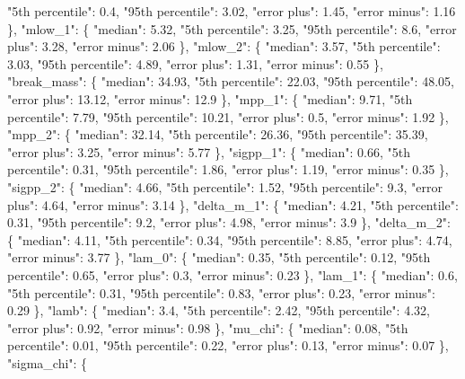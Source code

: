 {{        "5th percentile": 0.4, %
        "95th percentile": 3.02, %
        "error plus": 1.45, %
        "error minus": 1.16%
      \}, %
      "mlow\_1": \{%
        "median": 5.32, %
        "5th percentile": 3.25, %
        "95th percentile": 8.6, %
        "error plus": 3.28, %
        "error minus": 2.06%
      \}, %
      "mlow\_2": \{%
        "median": 3.57, %
        "5th percentile": 3.03, %
        "95th percentile": 4.89, %
        "error plus": 1.31, %
        "error minus": 0.55%
      \}, %
      "break\_mass": \{%
        "median": 34.93, %
        "5th percentile": 22.03, %
        "95th percentile": 48.05, %
        "error plus": 13.12, %
        "error minus": 12.9%
      \}, %
      "mpp\_1": \{%
        "median": 9.71, %
        "5th percentile": 7.79, %
        "95th percentile": 10.21, %
        "error plus": 0.5, %
        "error minus": 1.92%
      \}, %
      "mpp\_2": \{%
        "median": 32.14, %
        "5th percentile": 26.36, %
        "95th percentile": 35.39, %
        "error plus": 3.25, %
        "error minus": 5.77%
      \}, %
      "sigpp\_1": \{%
        "median": 0.66, %
        "5th percentile": 0.31, %
        "95th percentile": 1.86, %
        "error plus": 1.19, %
        "error minus": 0.35%
      \}, %
      "sigpp\_2": \{%
        "median": 4.66, %
        "5th percentile": 1.52, %
        "95th percentile": 9.3, %
        "error plus": 4.64, %
        "error minus": 3.14%
      \}, %
      "delta\_m\_1": \{%
        "median": 4.21, %
        "5th percentile": 0.31, %
        "95th percentile": 9.2, %
        "error plus": 4.98, %
        "error minus": 3.9%
      \}, %
      "delta\_m\_2": \{%
        "median": 4.11, %
        "5th percentile": 0.34, %
        "95th percentile": 8.85, %
        "error plus": 4.74, %
        "error minus": 3.77%
      \}, %
      "lam\_0": \{%
        "median": 0.35, %
        "5th percentile": 0.12, %
        "95th percentile": 0.65, %
        "error plus": 0.3, %
        "error minus": 0.23%
      \}, %
      "lam\_1": \{%
        "median": 0.6, %
        "5th percentile": 0.31, %
        "95th percentile": 0.83, %
        "error plus": 0.23, %
        "error minus": 0.29%
      \}, %
      "lamb": \{%
        "median": 3.4, %
        "5th percentile": 2.42, %
        "95th percentile": 4.32, %
        "error plus": 0.92, %
        "error minus": 0.98%
      \}, %
      "mu\_chi": \{%
        "median": 0.08, %
        "5th percentile": 0.01, %
        "95th percentile": 0.22, %
        "error plus": 0.13, %
        "error minus": 0.07%
      \}, %
      "sigma\_chi": \{%
}}
